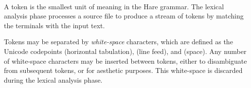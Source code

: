 
\begin{grammar}
\\
	 \\
	 \\
	 \\
	 \\
	 \\
	 \\

\oneof \\
	\terminal{!}
	\terminal{!=}
	\terminal{\%}
	\terminal{\%=}
	\terminal{\&}
	\terminal{\&\&}
	\terminal{\&\&=}
	\terminal{\&=}
	\terminal{(}
	\terminal{)}
	\terminal{*}
	\terminal{*=}
	\terminal{+}
	\terminal{+=}
	\terminal{,}
	\terminal{-}
	\terminal{-=}
	\terminal{/}
	\terminal{/=}
	\terminal{:}
	\terminal{::}
	\terminal{;}
	\terminal{<}
	\terminal{\textless{}\textless{}}
	\terminal{\textless{}\textless{}=}
	\terminal{<=}
	\terminal{=}
	\terminal{==}
	\terminal{=>}
	\terminal{>}
	\terminal{>=}
	\terminal{\textgreater{}\textgreater{}}
	\terminal{\textgreater{}\textgreater{}=}
	\terminal{[}
	\terminal{]}
	\terminal{\textasciicircum}
	\terminal{\textasciicircum=}
	\terminal{\textasciicircum\textasciicircum}
	\terminal{\textasciicircum\textasciicircum=}
	\terminal{\{}
	\terminal{|}
	\terminal{|=}
	\terminal{||}
	\terminal{||=}
	\terminal{\}}
	\terminal{\textasciitilde}

\exactly\\
	\terminal{//} 

\exactly\\
	 

\\

\end{grammar}

\specsubitem
A token is the smallest unit of meaning in the Hare grammar. The lexical
analysis phase processes a source file to produce a stream of tokens by matching
the terminals with the input text.

\specsubitem
Tokens may be separated by \textit{white-space} characters, which are defined as
the Unicode codepoints  (horizontal tabulation), 
(line feed), and  (space). Any number of white-space characters may
be inserted between tokens, either to disambiguate from subsequent tokens, or
for aesthetic purposes. This white-space is discarded during the lexical
analysis phase.

